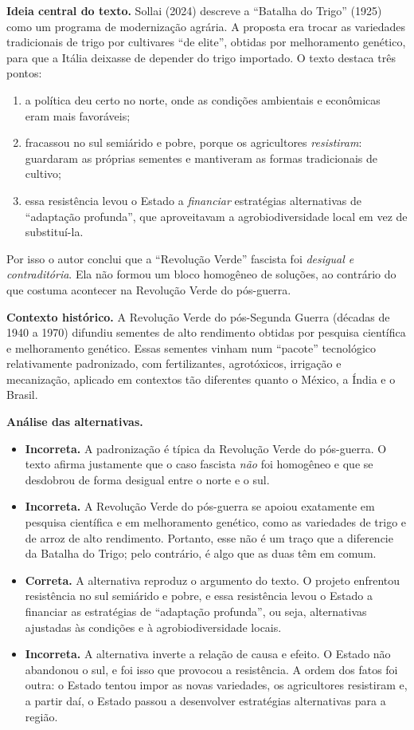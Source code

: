 \documentclass{article}%
\begin{document}
\textbf{Ideia central do texto.} Sollai (2024) descreve a ``Batalha do Trigo'' (1925) como um programa de modernização agrária. A proposta era trocar as variedades tradicionais de trigo por cultivares ``de elite'', obtidas por melhoramento genético, para que a Itália deixasse de depender do trigo importado. O texto destaca três pontos:
\begin{enumerate}
  \item a política deu certo no norte, onde as condições ambientais e econômicas eram mais favoráveis;
  \item fracassou no sul semiárido e pobre, porque os agricultores \emph{resistiram}: guardaram as próprias sementes e mantiveram as formas tradicionais de cultivo;
  \item essa resistência levou o Estado a \emph{financiar} estratégias alternativas de ``adaptação profunda'', que aproveitavam a agrobiodiversidade local em vez de substituí-la.
\end{enumerate}
Por isso o autor conclui que a ``Revolução Verde'' fascista foi \emph{desigual e contraditória}. Ela não formou um bloco homogêneo de soluções, ao contrário do que costuma acontecer na Revolução Verde do pós-guerra.

\textbf{Contexto histórico.} A Revolução Verde do pós-Segunda Guerra (décadas de 1940 a 1970) difundiu sementes de alto rendimento obtidas por pesquisa científica e melhoramento genético. Essas sementes vinham num ``pacote'' tecnológico relativamente padronizado, com fertilizantes, agrotóxicos, irrigação e mecanização, aplicado em contextos tão diferentes quanto o México, a Índia e o Brasil.

\textbf{Análise das alternativas.}
\begin{itemize}
  \item[a)] \textbf{Incorreta.} A padronização é típica da Revolução Verde do pós-guerra. O texto afirma justamente que o caso fascista \emph{não} foi homogêneo e que se desdobrou de forma desigual entre o norte e o sul.
  \item[b)] \textbf{Incorreta.} A Revolução Verde do pós-guerra se apoiou exatamente em pesquisa científica e em melhoramento genético, como as variedades de trigo e de arroz de alto rendimento. Portanto, esse não é um traço que a diferencie da Batalha do Trigo; pelo contrário, é algo que as duas têm em comum.
  \item[c)] \textbf{Correta.} A alternativa reproduz o argumento do texto. O projeto enfrentou resistência no sul semiárido e pobre, e essa resistência levou o Estado a financiar as estratégias de ``adaptação profunda'', ou seja, alternativas ajustadas às condições e à agrobiodiversidade locais.
  \item[d)] \textbf{Incorreta.} A alternativa inverte a relação de causa e efeito. O Estado não abandonou o sul, e foi isso que provocou a resistência. A ordem dos fatos foi outra: o Estado tentou impor as novas variedades, os agricultores resistiram e, a partir daí, o Estado passou a desenvolver estratégias alternativas para a região.
\end{itemize}
\end{document}
